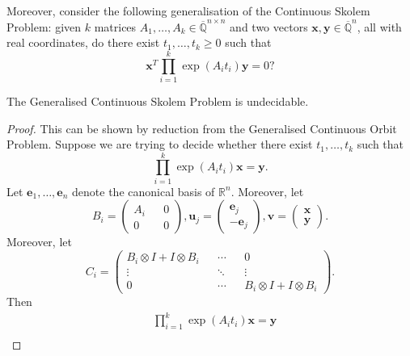 Moreover, consider the following generalisation of the Continuous Skolem Problem: given $k$ matrices $A_{1}, \ldots, A_{k} \in \overline{\mathbb{Q}}^{n \times n}$ and two vectors $\boldsymbol{x}, \boldsymbol{y} \in \overline{\mathbb{Q}}^{n}$, all with real coordinates, do there exist $t_{1}, \ldots, t_{k} \geq 0$ such that
\begin{equation}
\boldsymbol{x}^{T} \prod \limits_{i=1}^{k} \exp(A_{i} t_{i}) \boldsymbol{y} = 0 ?
\end{equation}

\begin{theorem}
The Generalised Continuous Skolem Problem is undecidable.
\end{theorem}

\begin{proof}
This can be shown by reduction from the Generalised Continuous Orbit Problem. Suppose we are trying to decide whether there exist $t_{1}, \ldots, t_{k}$ such that
\begin{equation*}
\prod \limits_{i=1}^{k} \exp(A_{i} t_{i}) \boldsymbol{x} = \boldsymbol{y} .
\end{equation*}
Let $\boldsymbol{e}_{1}, \ldots, \boldsymbol{e}_{n}$ denote the canonical basis of $\mathbb{R}^{n}$. Moreover, let
\begin{equation*}
B_{i} = \begin{pmatrix} A_{i} && 0 \\ 0 && 0 \end{pmatrix},
\boldsymbol{u}_{j} = \begin{pmatrix} \boldsymbol{e}_{j} \\ - \boldsymbol{e}_{j} \end{pmatrix},
\boldsymbol{v} = \begin{pmatrix} \boldsymbol{x} \\ \boldsymbol{y} \end{pmatrix} .
\end{equation*}
Moreover, let
\begin{equation*}
C_{i} = \begin{pmatrix} B_{i} \otimes I + I \otimes B_{i} && \cdots && 0 \\ \vdots && \ddots && \vdots \\ 0 && \cdots && B_{i} \otimes I + I \otimes B_{i} \end{pmatrix} .
\end{equation*}
Then
\begin{align*}
&\prod \limits_{i=1}^{k} \exp(A_{i} t_{i}) \boldsymbol{x} = \boldsymbol{y} \\

\end{align*}
\end{proof}
